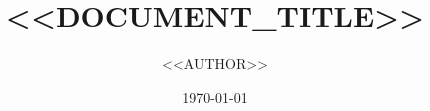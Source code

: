 \documentclass[../main.tex]{subfiles}
\begin{document}
\title{<<DOCUMENT_TITLE>>}
\author{<<AUTHOR>>}
\date{\today}

\maketitle




\ifshowcontents
  \tableofcontents
  \listoffigures
  \listoftables
  \printglossary[type=\acronymtype]
\fi
\end{document}
